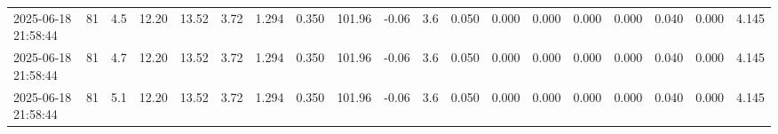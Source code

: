 \documentclass[UTF8,10pt,a4paper,fontset=fandol]{ctexart}
\begin{document}
\begin{center}
{{\begin{tabular}{|l|r|r|r|r|r|r|r|r|r|r|r|r|r|r|r|r|r|}
2025-06-18 21:58:44 & 81 & 4.5 & 12.20 & 13.52 & 3.72 & 1.294 & 0.350 & 101.96 & -0.06 & 3.6 & 0.050 & 0.000 & 0.000 & 0.000 & 0.000 & 0.040 & 0.000 & 4.145 \\
2025-06-18 21:58:44 & 81 & 4.7 & 12.20 & 13.52 & 3.72 & 1.294 & 0.350 & 101.96 & -0.06 & 3.6 & 0.050 & 0.000 & 0.000 & 0.000 & 0.000 & 0.040 & 0.000 & 4.145 \\
2025-06-18 21:58:44 & 81 & 5.1 & 12.20 & 13.52 & 3.72 & 1.294 & 0.350 & 101.96 & -0.06 & 3.6 & 0.050 & 0.000 & 0.000 & 0.000 & 0.000 & 0.040 & 0.000 & 4.145 \\
\hline
\end{tabular}%
}%
}
\end{center}


\newpage
\end{document}
